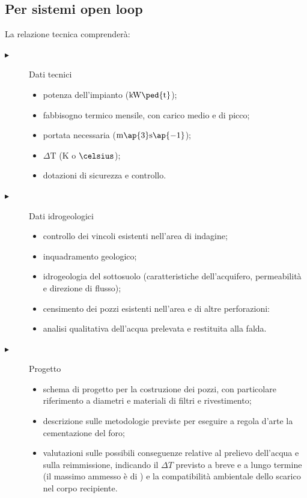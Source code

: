 \subsection{Per sistemi open loop}
La relazione tecnica comprenderà:
\begin{description}
\item[$\blacktriangleright$] Dati tecnici
\begin{itemize}
\item potenza dell'impianto ($\mathrm{kW\ped{t}}$);
\item fabbisogno termico mensile, con carico medio e di picco;
\item portata necessaria ($\mathrm{m\ap{3}s\ap{-1}}$);
\item $\Delta \mathrm{T}$ (K o $\celsius$);
\item dotazioni di sicurezza e controllo.
\end{itemize}
\item[$\blacktriangleright$] Dati idrogeologici
\begin{itemize}
\item controllo dei vincoli esistenti nell'area di indagine;
\item inquadramento geologico;
\item idrogeologia del sottosuolo (caratteristiche dell'acquifero, permeabilità e direzione di flusso);
\item censimento dei pozzi esistenti nell'area e di altre perforazioni:
\item analisi qualitativa dell'acqua prelevata e restituita alla falda.
\end{itemize}
\item[$\blacktriangleright$] Progetto
\begin{itemize}
\item schema di progetto per la costruzione dei pozzi, con particolare riferimento a diametri e materiali di filtri e rivestimento;
\item descrizione sulle metodologie previste per eseguire a regola d'arte la cementazione del foro;
\item valutazioni sulle possibili conseguenze relative al prelievo dell'acqua e sulla reimmissione, indicando il $\Delta T$ previsto a breve e a lungo termine (il massimo ammesso è di ) e la compatibilità ambientale dello scarico nel corpo recipiente.
\end{itemize}
\end{description}

